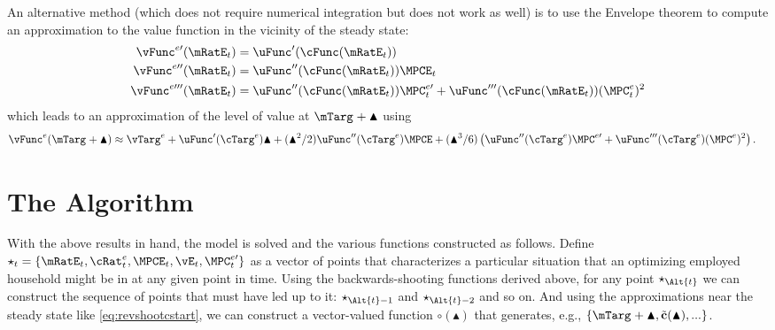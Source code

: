 \documentclass{\handout}
\begin{document}
\begin{CDCPrivate} 
An alternative method (which does not require numerical integration but does not work as well) is to use the Envelope theorem to compute an approximation to the 
value function in the vicinity of the steady state:
\begin{equation}\begin{gathered}\begin{aligned}
    \vFunc^{e \prime}(\mRatE_{t}) & =  \uFunc^{\prime}(\cFunc(\mRatE_{t}))
\\  \vFunc^{e \prime\prime}(\mRatE_{t}) & =  \uFunc^{\prime\prime}(\cFunc(\mRatE_{t}))\MPCE_{t}
\\  \vFunc^{e \prime\prime\prime}(\mRatE_{t}) & =  \uFunc^{\prime\prime}(\cFunc(\mRatE_{t}))\MPC^{e\prime}_{t}+\uFunc^{\prime\prime\prime}(\cFunc(\mRatE_{t}))(\MPC^{e}_{t})^{2}
\end{aligned}\end{gathered}\end{equation}
which leads to an approximation of the level of value at $\mTarg^{\null}+\blacktriangle$ using 
\begin{equation}\begin{gathered}\begin{aligned}
 \vFunc^{e}(\mTarg^{\null}+\blacktriangle) & \approx  \vTarg^{e} + \uFunc^{\prime}(\cTarg^{e})\blacktriangle + (\blacktriangle^{2}/2)\uFunc^{\prime\prime}(\cTarg^{e})\MPCE + (\blacktriangle^{3}/6)\left(\uFunc^{\prime\prime}(\cTarg^{e})\MPC^{e\prime}+\uFunc^{\prime\prime\prime}(\cTarg^{e})(\MPC^{e})^{2}\right) \nonumber
.
\end{aligned}\end{gathered}\end{equation}

\end{CDCPrivate}


\section{The Algorithm}

With the above results in hand, the model is solved and the various
functions constructed as follows.  Define $\star_{t} =
\{\mRatE_{t},{\cRat}^{e}_{t},\MPCE_{t},\vE_{t},\MPC_{t}^{e\prime}\}$ as a vector of points that
characterizes a particular situation that an optimizing employed
household might be in at any given point in time.  Using the backwards-shooting 
functions derived above, for any point $\star_{\Alt{t}}$ we can construct the
sequence of points that must have led up to it: $\star_{\Alt{t}-1}$ and
$\star_{\Alt{t}-2}$ and so on.  And using the approximations near the
steady state like \eqref{eq:revshootcstart}, we can construct 
a vector-valued function $\pmb{\circ}(\blacktriangle)$ that generates, 
e.g., $\{\mTarg^{\null}+\blacktriangle,\tilde{\mathbf{c}}(\blacktriangle), ... \}$.
\end{document}
